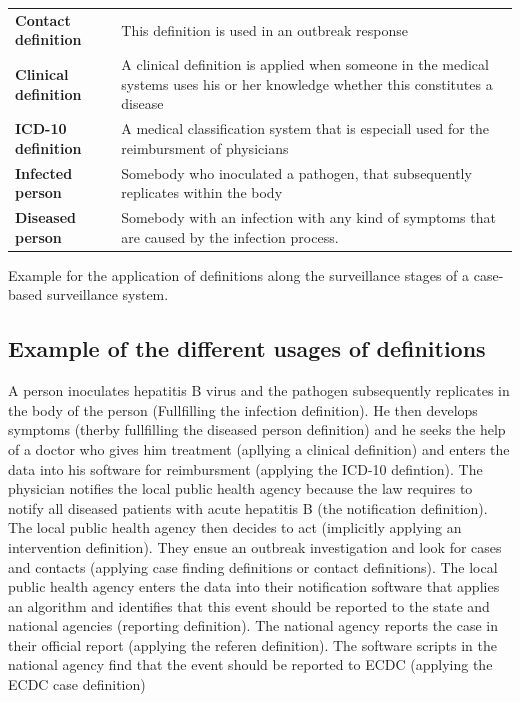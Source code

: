 \documentclass[
  letterpaper,
  DIV=11,
  numbers=noendperiod]{scrreprt}
\begin{document}
\begin{longtable}[]{@{}
  >{\raggedright\arraybackslash}p{}
  >{\raggedright\arraybackslash}p{}@{}}
\textbf{Contact definition} & This definition is used in an outbreak
response \\
\textbf{Clinical definition} & A clinical definition is applied when
someone in the medical systems uses his or her knowledge whether this
constitutes a disease \\
\textbf{ICD-10 definition} & A medical classification system that is
especiall used for the reimbursment of physicians \\
\textbf{Infected person} & Somebody who inoculated a pathogen, that
subsequently replicates within the body \\
\textbf{Diseased person} & Somebody with an infection with any kind of
symptoms that are caused by the infection process. \\
\end{longtable}

Example for the application of definitions along the surveillance stages
of a case-based surveillance system.

\subsection{Example of the different usages of
definitions}\label{example-of-the-different-usages-of-definitions}

A person inoculates hepatitis B virus and the pathogen subsequently
replicates in the body of the person (Fullfilling the infection
definition). He then develops symptoms (therby fullfilling the diseased
person definition) and he seeks the help of a doctor who gives him
treatment (apllying a clinical definition) and enters the data into his
software for reimbursment (applying the ICD-10 defintion). The physician
notifies the local public health agency because the law requires to
notify all diseased patients with acute hepatitis B (the notification
definition). The local public health agency then decides to act
(implicitly applying an intervention definition). They ensue an outbreak
investigation and look for cases and contacts (applying case finding
definitions or contact definitions). The local public health agency
enters the data into their notification software that applies an
algorithm and identifies that this event should be reported to the state
and national agencies (reporting definition). The national agency
reports the case in their official report (applying the referen
definition). The software scripts in the national agency find that the
event should be reported to ECDC (applying the ECDC case definition)
\end{document}
